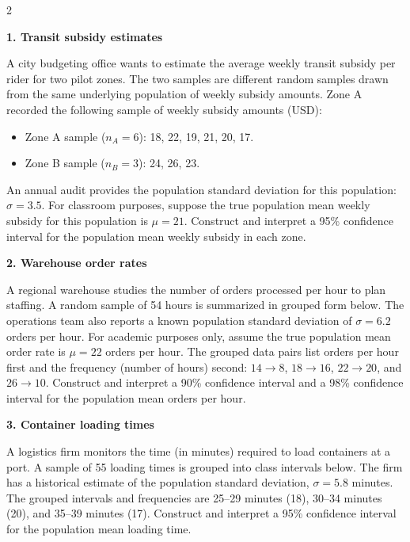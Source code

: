 \documentclass[12pt]{article}
\newcommand{\SubsectionBox}[1]{%
	\noindent\colorbox{gray!30}{%
		\parbox{\linewidth}{\textbf{#1}}%
	}\par\vspace{0.35cm}%
}
\begin{document}
	\begin{multicols}{2}

		\SubsectionBox{1. Transit subsidy estimates}\vspace{-0.25cm}
		A city budgeting office wants to estimate the average weekly transit subsidy per rider for two pilot zones.
		The two samples are different random samples drawn from the same underlying population of weekly subsidy amounts.
		Zone A recorded the following sample of weekly subsidy amounts (USD):

		\begin{itemize}
			\item Zone A sample (\(n_A = 6\)): 18, 22, 19, 21, 20, 17.
			\item Zone B sample (\(n_B = 3\)): 24, 26, 23.
		\end{itemize}

		An annual audit provides the population standard deviation for this population: \(\sigma = 3.5\).
		For classroom purposes, suppose the true population mean weekly subsidy for this population is \(\mu = 21\).
		Construct and interpret a 95\% confidence interval for the population mean weekly subsidy in each zone.

		\vspace{0.25cm}
		\SubsectionBox{2. Warehouse order rates}\vspace{-0.25cm}
		A regional warehouse studies the number of orders processed per hour to plan staffing.
		A random sample of 54 hours is summarized in grouped form below. The operations team also reports a known population standard deviation of \(\sigma = 6.2\) orders per hour.
		For academic purposes only, assume the true population mean order rate is \(\mu = 22\) orders per hour.
		The grouped data pairs list orders per hour first and the frequency (number of hours) second: \(14 \rightarrow 8\), \(18 \rightarrow 16\), \(22 \rightarrow 20\), and \(26 \rightarrow 10\).
		Construct and interpret a 90\% confidence interval and a 98\% confidence interval for the population mean orders per hour.

		\vspace{0.25cm}
		\SubsectionBox{3. Container loading times}\vspace{-0.25cm}
		A logistics firm monitors the time (in minutes) required to load containers at a port.
		A sample of 55 loading times is grouped into class intervals below. The firm has a historical estimate of the population standard deviation, \(\sigma = 5.8\) minutes.
		The grouped intervals and frequencies are 25--29 minutes (18), 30--34 minutes (20), and 35--39 minutes (17).
		Construct and interpret a 95\% confidence interval for the population mean loading time.

	\end{multicols}
\end{document}
